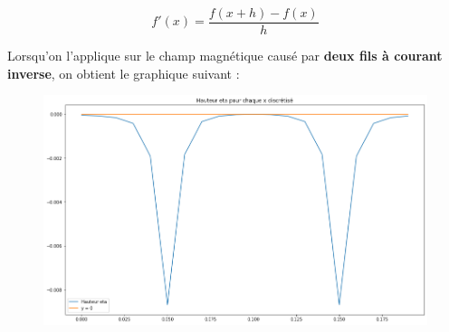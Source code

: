 \documentclass{article}
\begin{document}
\begin{equation}
f\prime(x) = \frac{f(x + h) - f(x)}{h}
\label{eq05}
\end{equation}

Lorsqu'on l'applique sur le champ magnétique causé par \textbf{deux fils à courant inverse}, on obtient le graphique suivant :
\begin{figure}[h]
	\centering
    \includegraphics[width=.5\linewidth]{Hauteur.png}
    
\end{figure}
\end{document}
